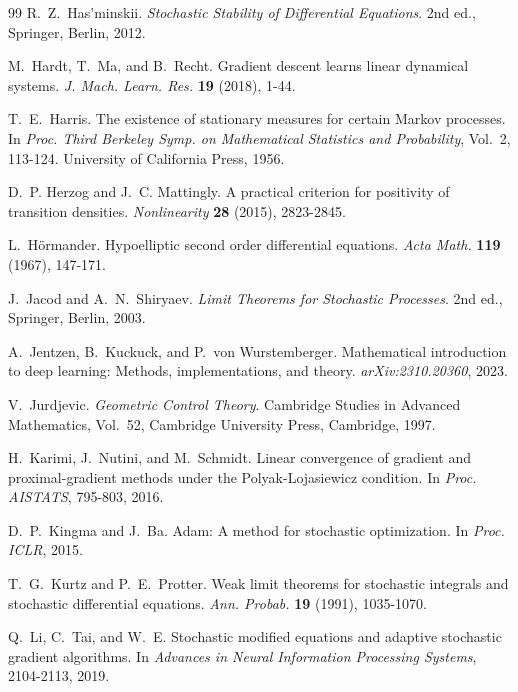 \documentclass[11pt, a4paper,leqno]{amsart}
\theoremstyle{definition}
\numberwithin{equation}{section}
\begin{document}
\begin{thebibliography}{99}
R.~Z.~Has'minskii.
\newblock \emph{Stochastic Stability of Differential Equations}.
\newblock 2nd ed., Springer, Berlin, 2012.

M.~Hardt, T.~Ma, and B.~Recht.
\newblock Gradient descent learns linear dynamical systems.
\newblock \emph{J. Mach. Learn. Res.} \textbf{19} (2018), 1-44.

T.~E.~Harris.
\newblock The existence of stationary measures for certain Markov processes.
\newblock In \emph{Proc. Third Berkeley Symp. on Mathematical Statistics and Probability}, Vol.~2, 113-124.
\newblock University of California Press, 1956.


D.~P. Herzog and J.~C. Mattingly.
\newblock A practical criterion for positivity of transition densities.
\newblock \emph{Nonlinearity} \textbf{28} (2015), 2823-2845.

L.~H\"ormander.
\newblock Hypoelliptic second order differential equations.
\newblock \emph{Acta Math.} \textbf{119} (1967), 147-171.

J.~Jacod and A.~N.~Shiryaev.
\newblock \emph{Limit Theorems for Stochastic Processes}.
\newblock 2nd ed., Springer, Berlin, 2003.

A.~Jentzen, B.~Kuckuck, and P.~von Wurstemberger.
\newblock Mathematical introduction to deep learning: Methods, implementations, and theory.
\newblock \emph{arXiv:2310.20360}, 2023.

V.~Jurdjevic.
\newblock \emph{Geometric Control Theory}.
\newblock Cambridge Studies in Advanced Mathematics, Vol.~52, Cambridge University Press, Cambridge, 1997.

H.~Karimi, J.~Nutini, and M.~Schmidt.
\newblock Linear convergence of gradient and proximal-gradient methods under the Polyak-Lojasiewicz condition.
\newblock In \emph{Proc. AISTATS}, 795-803, 2016.

D.~P.~Kingma and J.~Ba.
\newblock Adam: A method for stochastic optimization.
\newblock In \emph{Proc. ICLR}, 2015.

T.~G.~Kurtz and P.~E.~Protter.
\newblock Weak limit theorems for stochastic integrals and stochastic differential equations.
\newblock \emph{Ann. Probab.} \textbf{19} (1991), 1035-1070.

Q.~Li, C.~Tai, and W.~E.
\newblock Stochastic modified equations and adaptive stochastic gradient algorithms.
\newblock In \emph{Advances in Neural Information Processing Systems}, 2104-2113, 2019.


\end{thebibliography}
\end{document}
